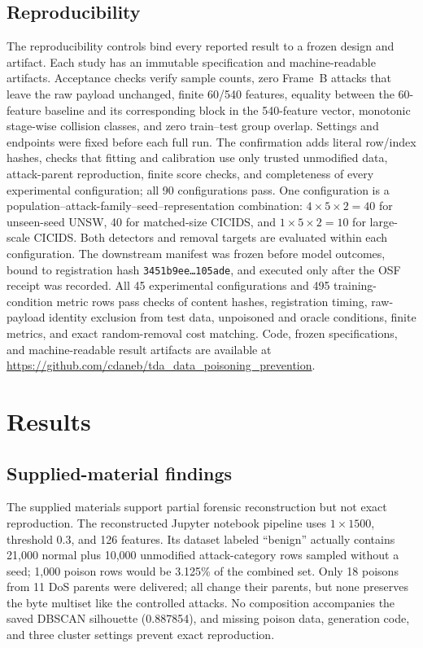 \documentclass[conference]{IEEEtran}
\begin{document}
\subsection{Reproducibility}
The reproducibility controls bind every reported result to a frozen design and artifact.
Each study has an immutable specification and machine-readable artifacts.
Acceptance checks verify sample counts, zero Frame~B attacks that leave the raw
payload unchanged, finite 60/540 features, equality between the 60-feature
baseline and its corresponding block in the 540-feature vector, monotonic
stage-wise collision classes, and zero train--test group overlap.
Settings and endpoints were fixed before each full run. The confirmation adds
literal row/index hashes, checks that fitting and calibration use only trusted
unmodified data, attack-parent
reproduction, finite score checks, and completeness of every experimental
configuration; all 90 configurations pass. One configuration is a
population--attack-family--seed--representation combination:
$4\times5\times2=40$ for unseen-seed UNSW, 40 for matched-size CICIDS, and
$1\times5\times2=10$ for large-scale CICIDS. Both detectors and removal targets are evaluated
within each configuration. The downstream manifest was frozen before model outcomes,
bound to registration hash
\texttt{3451b9ee\ldots 105ade}, and executed only after the OSF receipt was
recorded. All 45 experimental configurations and 495 training-condition metric
rows pass checks of content hashes, registration timing, raw-payload identity
exclusion from test data, unpoisoned and oracle conditions, finite metrics, and exact
random-removal cost matching. Code, frozen specifications, and machine-readable result
artifacts are available at
\url{https://github.com/cdaneb/tda_data_poisoning_prevention}.

\section{Results}
\subsection{Supplied-material findings}
The supplied materials support partial forensic reconstruction but not exact reproduction.
The reconstructed Jupyter notebook pipeline uses $1\times1500$, threshold 0.3,
and 126 features. Its dataset labeled ``benign'' actually contains 21,000 normal plus 10,000 unmodified
attack-category rows sampled without a seed; 1,000 poison rows would be 3.125\%
of the combined set. Only 18 poisons from 11 DoS parents were delivered; all
change their parents, but none preserves the byte multiset like the controlled
attacks. No composition accompanies the saved DBSCAN silhouette (0.887854),
and missing poison data, generation code, and three cluster settings prevent
exact reproduction.
\end{document}
